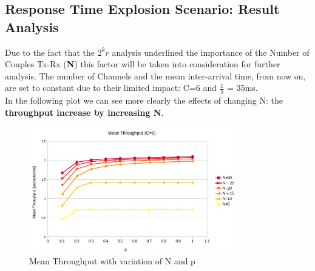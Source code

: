 \subsection{Response Time Explosion Scenario: Result Analysis}
Due to the fact that the $2^{k}r$ analysis underlined the importance of the Number of Couples Tx-Rx (\textbf{N}) this factor will be taken into consideration for further analysis. The number of Channels and the mean inter-arrival time, from now on, are set to constant due to their limited impact: C=6 and $\frac{1}{\lambda}$ = 35ms. \\
In the following plot we can see more clearly the effects of changing N: the \textbf{throughput increase by increasing N}.
 
\begin{figure}[H]
	\centering
	\includegraphics[width=0.8\textwidth]{img/MeanThroughputBufferExplosion.png}
	\caption{Mean Throughput with variation of N and p}
	\label{img: insight4}
\end{figure}

